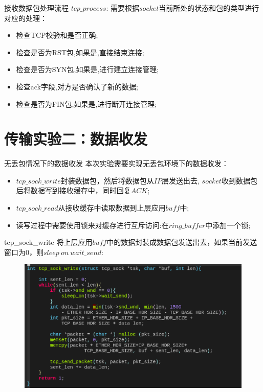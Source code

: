 \documentclass{beamer}
\begin{document}
\begin{frame}{接收数据包处理流程}
  $tcp\_process$: 需要根据$socket$当前所处的状态和包的类型进行对应的处理：
  \begin{itemize}
	\item 检查TCP校验和是否正确;
	  \item 检查是否为RST包,如果是,直接结束连接;
		\item 检查是否为SYN包,如果是,进行建立连接管理;
		  \item 检查ack字段,对方是否确认了新的数据;
			\item 检查是否为FIN包,如果是,进行断开连接管理;
  \end{itemize}
\end{frame}

\section{传输实验二：数据收发}
\begin{frame}{无丢包情况下的数据收发}
  本次实验需要实现无丢包环境下的数据收发：
  \begin{itemize}
	\item $tcp\_sock\_write$封装数据包，然后将数据包从$IP$层发送出去, $socket$收到数据包后将数据写到接收缓存中，同时回复$ACK$;
	  \item $tcp\_sock\_read$从接收缓存中读取数据到上层应用$buff$中;
		\item 读写过程中需要使用锁来对缓存进行互斥访问:在$ring\_buffer$中添加一个锁;
  \end{itemize}
\end{frame}

\begin{frame}{tcp\_sock\_write}
  将上层应用$buff$中的数据封装成数据包发送出去，如果当前发送窗口为$0$，则$sleep\ on\ wait\_send$:
  \begin{figure}[H]
	\centering
	\includegraphics[scale = 0.35]{./fig/write.png}
  \end{figure}
\end{frame}
\end{document}
